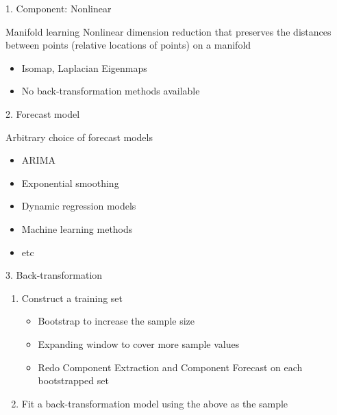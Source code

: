 \documentclass[14pt,ignorenonframetext,]{beamer}
\providecommand{\tightlist}{%
  \setlength{\itemsep}{0pt}\setlength{\parskip}{0pt}}
\begin{document}
\begin{frame}{1. Component: Nonlinear}
\protect\hypertarget{component-nonlinear}{}
\begin{block}{Manifold learning}
\protect\hypertarget{manifold-learning}{}
Nonlinear dimension reduction that preserves the distances between
points (relative locations of points) on a manifold

\begin{itemize}
\tightlist
\item
  Isomap, Laplacian Eigenmaps
\item
  No back-transformation methods available
\end{itemize}
\end{block}
\end{frame}

\begin{frame}{2. Forecast model}
\protect\hypertarget{forecast-model}{}
\begin{block}{Arbitrary choice of forecast models}
\protect\hypertarget{arbitrary-choice-of-forecast-models}{}
\begin{itemize}
\tightlist
\item
  ARIMA
\item
  Exponential smoothing
\item
  Dynamic regression models
\item
  Machine learning methods
\item
  etc
\end{itemize}
\end{block}
\end{frame}

\begin{frame}{3. Back-transformation}
\protect\hypertarget{back-transformation}{}
\begin{enumerate}
\tightlist
\item
  Construct a training set

  \begin{itemize}
  \tightlist
  \item
    Bootstrap to increase the sample size
  \item
    Expanding window to cover more sample values
  \item
    Redo Component Extraction and Component Forecast on each
    bootstrapped set
  \end{itemize}
\item
  Fit a back-transformation model using the above as the sample
\end{enumerate}
\end{frame}
\end{document}
